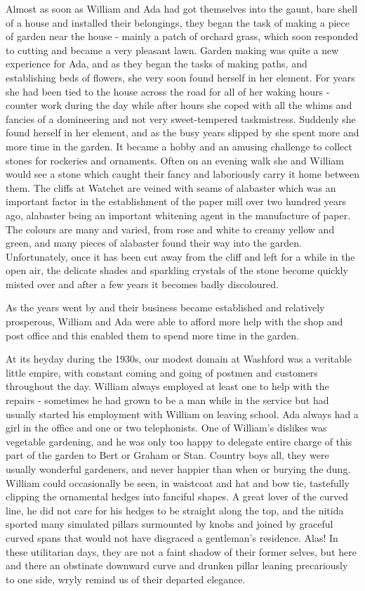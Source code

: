 
Almost as soon as William and Ada had got themselves into the gaunt, bare shell of a house and installed their belongings, they began the task of making a piece of garden near the house - mainly a patch of orchard grass, which soon responded to cutting and became a very pleasant lawn. Garden making was quite a new experience for Ada, and as they began the tasks of making paths, and establishing beds of flowers, she very soon found herself in her element. For years she had been tied to the house across the road for all of her waking hours - counter work during the day while after hours she coped with all the whims and fancies of a domineering and not very sweet-tempered taskmistress. Suddenly she found herself in her element, and as the busy years slipped by she spent more and more time in the garden. It became a hobby and an amusing challenge to collect stones for rockeries and ornaments. Often on an evening walk she and William would see a stone which caught their fancy and laboriously carry it home between them. The cliffs at Watchet are veined with seams of alabaster which was an important factor in the establishment of the paper mill over two hundred years ago, alabaster being an important whitening agent in the manufacture of paper. The colours are many and varied, from rose and white to creamy yellow and green, and many pieces of alabaster found their way into the garden. Unfortunately, once it has been cut away from the cliff and left for a while in the open air, the delicate shades and sparkling crystals of the stone become quickly misted over and after a few years it becomes badly discoloured.

As the years went by and their business became established and relatively prosperous, William and Ada were able to afford more help with the shop and post office and this enabled them to spend more time in the garden.

At its heyday during the 1930s, our modest domain at Washford was a veritable little empire, with constant coming and going of postmen and customers throughout the day. William always employed at least one  to help with the repairs - sometimes he had grown to be a man while in the service but had usually started his employment with William on leaving school. Ada always had a girl in the office and one or two telephonists. One of William's dislikes was vegetable gardening, and he was only too happy to delegate entire charge of this part of the garden to Bert or Graham or Stan. Country boys all, they were usually wonderful gardeners, and never happier than when  or burying the dung. William could occasionally be seen, in waistcoat and hat and bow tie, tastefully clipping the ornamental hedges into fanciful shapes. A great lover of the curved line, he did not care for his hedges to be straight along the top, and the nitida sported many simulated pillars surmounted by knobs and joined by graceful curved spans that would not have disgraced a gentleman's residence. Alas! In these utilitarian days, they are not a faint shadow of their former selves, but here and there an obstinate downward curve and drunken pillar leaning precariously to one side, wryly remind us of their departed elegance.

